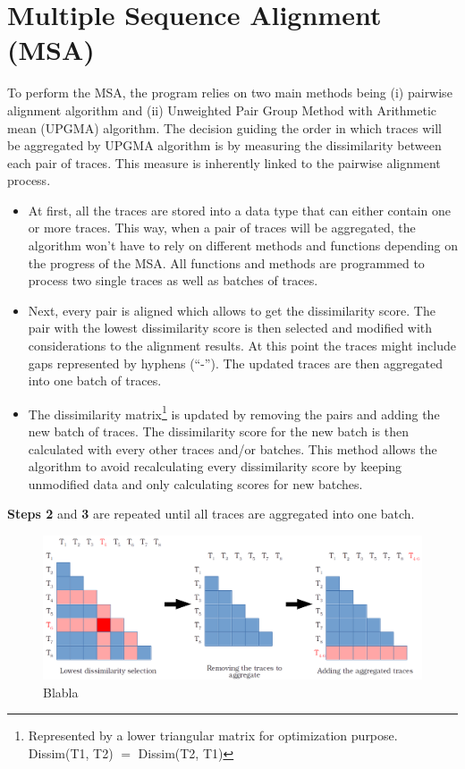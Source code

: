 \documentclass[12pt,a4paper]{article}
\begin{document}
\section{Multiple Sequence Alignment (MSA)}


To perform the MSA, the program relies on two main methods being (i) pairwise alignment algorithm and (ii) Unweighted Pair Group Method with Arithmetic mean (UPGMA) algorithm.
The decision guiding the order in which traces will be aggregated by UPGMA algorithm is by measuring the dissimilarity between each pair of traces. This measure is inherently linked to the pairwise alignment process.

\begin{itemize}
\item[\textbf{Step 1}] At first, all the traces are stored into a data type that can either contain one or more traces.
This way, when a pair of traces will be aggregated, the algorithm won't have to rely on different methods and functions depending on the progress of the MSA.
All functions and methods are programmed to process two single traces as well as batches of traces.

\item[\textbf{Step 2}] Next, every pair is aligned which allows to get the dissimilarity score.
The pair with the lowest dissimilarity score is then selected and modified with considerations to the alignment results.
At this point the traces might include gaps represented by hyphens (``-'').
The updated traces are then aggregated into one batch of traces.

\item[\textbf{Step 3}] The dissimilarity matrix\footnote{Represented by a lower triangular matrix for optimization purpose. Dissim(T1, T2) $=$ Dissim(T2, T1)} is updated by removing the pairs and adding the new batch of traces.
The dissimilarity score for the new batch is then calculated with every other traces and/or batches.
This method allows the algorithm to avoid recalculating every dissimilarity score by keeping unmodified data and only calculating scores for new batches.
\end{itemize}

\textbf{Steps 2} and \textbf{3} are repeated until all traces are aggregated into one batch.

\begin{figure}[H]
	\centering
	\includegraphics[width=1\linewidth]{img/matrix_aggregation.png}
	\caption{Blabla}
	\label{img:matrix}
\end{figure}
\end{document}
